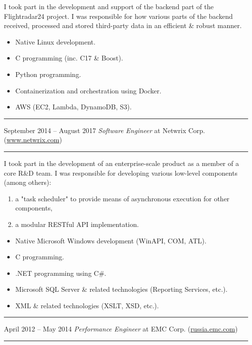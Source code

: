 \documentclass[11pt]{article}
\newcommand\CXX{C\nolinebreak[4]\hspace{-.05em}\raisebox{.4ex}{\relsize{-3}{\textbf{++}}}}
\newcommand\CvSmallSkipLength{0.5em}
\newcommand\CvSkip[1]{\vspace{#1}}
\newcommand\CvSmallSkip{\CvSkip{\CvSmallSkipLength}}
\newcommand\CvRule{\begingroup\color{CvRuleColor}\hrule\endgroup}
\newcommand\CvWorkplaceHeader[5]{\begingroup%
  \CvRule\nopagebreak%
  \fboxsep0pt%
  \colorbox{CvWorkplaceHeaderColor}{%
    \begin{minipage}{\linewidth-2\fboxsep}%
\CvSmallSkip%
#1 -- #2 \hfill \textit{#3} at #4 (\href{http://#5/}{#5})%
\CvSmallSkip%
    \end{minipage}%
  }%
  \CvRule%
\endgroup%
}
\newenvironment{CvWorkplaceDescription}{%
    \begingroup\setlength\parskip{\CvSmallSkipLength}%
  }{%
    \CvSmallSkip\endgroup%
  }
\begin{document}
\begin{CvWorkplaceDescription}
I took part in the development and support of the backend part of the
Flightradar24 project.
I was responsible for how various parts of the backend received, processed and
stored third-party data in an efficient \& robust manner.

\begin{itemize}[noitemsep]
  \item Native Linux development.
  \item {\CXX} programming (inc. {\CXX}17 \& Boost).
  \item Python programming.
  \item Containerization and orchestration using Docker.
  \item AWS (EC2, Lambda, DynamoDB, S3).
\end{itemize}
\end{CvWorkplaceDescription}

\CvWorkplaceHeader{September 2014}{August 2017}{Software Engineer}{Netwrix Corp.}{www.netwrix.com}

\begin{CvWorkplaceDescription}
I took part in the development of an enterprise-scale product as a member of a
core R\&D team.
I was responsible for developing various low-level components (among others):
\begin{enumerate}[noitemsep]
  \item a "task scheduler" to provide means of asynchronous execution for
other components,
  \item a modular RESTful API implementation.
\end{enumerate}

\begin{itemize}[noitemsep]
  \item Native Microsoft Windows development (WinAPI, COM, ATL).
  \item {\CXX} programming.
  \item .NET programming using C\#.
  \item Microsoft SQL Server \& related technologies (Reporting Services,
etc.).
  \item XML \& related technologies (XSLT, XSD, etc.).
\end{itemize}
\end{CvWorkplaceDescription}

\CvWorkplaceHeader{April 2012}{May 2014}{Performance Engineer}{EMC Corp.}{russia.emc.com}
\end{document}
